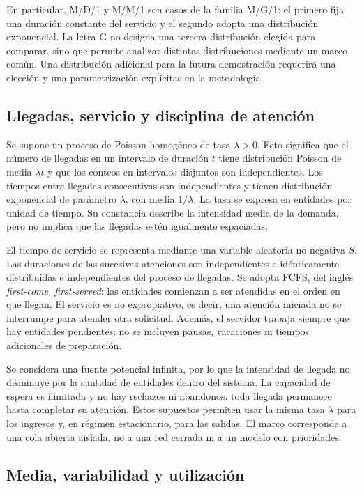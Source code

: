 En particular, M/D/1 y M/M/1 son casos de la familia M/G/1: el primero fija una duración constante del servicio y el segundo adopta una distribución exponencial. La letra G no designa una tercera distribución elegida para comparar, sino que permite analizar distintas distribuciones mediante un marco común. Una distribución adicional para la futura demostración requerirá una elección y una parametrización explícitas en la metodología.

\subsection{Llegadas, servicio y disciplina de atención}
\label{subsec:llegadas-servicio-fcfs}

Se supone un proceso de Poisson homogéneo de tasa $\lambda>0$. Esto significa que el número de llegadas en un intervalo de duración $t$ tiene distribución Poisson de media $\lambda t$ y que los conteos en intervalos disjuntos son independientes. Los tiempos entre llegadas consecutivas son independientes y tienen distribución exponencial de parámetro $\lambda$, con media $1/\lambda$. La tasa se expresa en entidades por unidad de tiempo. Su constancia describe la intensidad media de la demanda, pero no implica que las llegadas estén igualmente espaciadas.

El tiempo de servicio se representa mediante una variable aleatoria no negativa $S$. Las duraciones de las sucesivas atenciones son independientes e idénticamente distribuidas e independientes del proceso de llegadas. Se adopta FCFS, del inglés \emph{first-come, first-served}: las entidades comienzan a ser atendidas en el orden en que llegan. El servicio es no expropiativo, es decir, una atención iniciada no se interrumpe para atender otra solicitud. Además, el servidor trabaja siempre que hay entidades pendientes; no se incluyen pausas, vacaciones ni tiempos adicionales de preparación.

Se considera una fuente potencial infinita, por lo que la intensidad de llegada no disminuye por la cantidad de entidades dentro del sistema. La capacidad de espera es ilimitada y no hay rechazos ni abandonos: toda llegada permanece hasta completar su atención. Estos supuestos permiten usar la misma tasa $\lambda$ para los ingresos y, en régimen estacionario, para las salidas. El marco corresponde a una cola abierta aislada, no a una red cerrada ni a un modelo con prioridades.

\subsection{Media, variabilidad y utilización}
\label{subsec:variabilidad-utilizacion}

